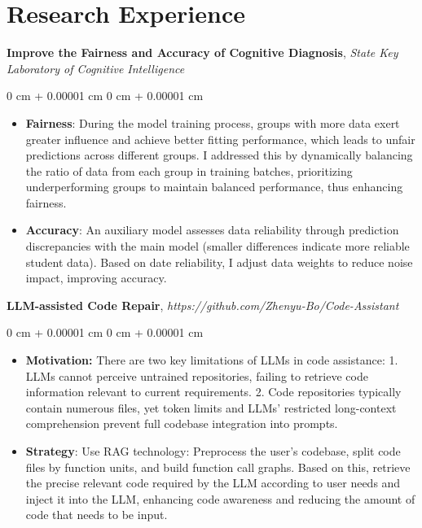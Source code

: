 \documentclass[10pt, letterpaper]{article}
\newenvironment{highlights}{
    \begin{itemize}[
        topsep=0.10 cm,
        parsep=0.10 cm,
        partopsep=0pt,
        itemsep=0pt,
        leftmargin=0 cm + 10pt
    ]
}{
    \end{itemize}
} %
\newenvironment{onecolentry}{
    \begin{adjustwidth}{
        0 cm + 0.00001 cm
    }{
        0 cm + 0.00001 cm
    }
}{
    \end{adjustwidth}
} %
\begin{document}
    \section{Research Experience}        
        \textbf{Improve the Fairness and Accuracy of Cognitive Diagnosis}, \textit{State Key Laboratory of Cognitive Intelligence}
        \vspace{0.10 cm}
        \begin{onecolentry}
            \begin{highlights}
                \item \textbf{Fairness}: During the model training process, groups with more data exert greater influence and achieve better fitting performance, which leads to unfair predictions across different groups. 
                I addressed this by dynamically balancing the ratio of data from each group in training batches, prioritizing underperforming groups to maintain balanced performance, thus enhancing fairness.
                \item \textbf{Accuracy}: An auxiliary model assesses data reliability through prediction discrepancies with the main model (smaller differences indicate more reliable student data). Based on date reliability, I adjust data weights to reduce noise impact, improving accuracy.
            \end{highlights}
        \end{onecolentry}


        \vspace{0.2 cm}

        \textbf{LLM-assisted Code Repair},
        \textit{https://github.com/Zhenyu-Bo/Code-Assistant}

        \vspace{0.10 cm}
        \begin{onecolentry}
            \begin{highlights}
                \item \textbf{Motivation:} There are two key limitations of LLMs in code assistance: 1. LLMs cannot perceive untrained repositories, failing to retrieve code information relevant to current requirements.
                        2. Code repositories typically contain numerous files, yet token limits and LLMs' restricted long-context comprehension prevent full codebase integration into prompts.
                \item \textbf{Strategy}: Use RAG technology: Preprocess the user's codebase, split code files by function units, and build function call graphs. Based on this, retrieve the precise relevant code required by the LLM according to user needs and inject it into the LLM, enhancing code awareness and reducing the amount of code that needs to be input.
            \end{highlights}
        \end{onecolentry}
\end{document}
